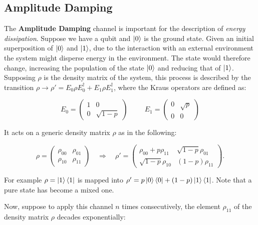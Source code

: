 \subsection{Amplitude Damping} 
\label{Amp_section}

The \textbf{Amplitude Damping} channel is important for the description of \textit{energy dissipation}. Suppose we have a qubit and $\left| 0 \right \rangle$ is the ground state. Given an initial superposition of $\left| 0 \right \rangle$ and $\left| 1 \right \rangle$, due to the interaction with an external environment the system might disperse energy in the environment. The state would therefore change, increasing the population of the state $\left| 0 \right \rangle$ and reducing that of $\left| 1 \right \rangle$. Supposing $\rho$ is the density matrix of the system, this process is described by the transition $\rho \rightarrow \rho' = E_0 \rho E_0^\dagger + E_1 \rho E_1^\dagger$, where the Kraus operators are defined as:

\begin{equation}
E_0 = \begin{pmatrix} 1 & 0\\  0 & \sqrt{1-p} \end{pmatrix} \hspace{1cm} E_1 = \begin{pmatrix} 0 & \sqrt{p} \\  0 & 0 \end{pmatrix}
\label{28_firstchapter}
 \end{equation}

\noindent It acts on a generic density matrix $\rho$ as in the following:
 
 \begin{equation}
\rho = \begin{pmatrix} 
\rho_{00} & \rho_{01} \\
\rho_{10} & \rho_{11} 
\end{pmatrix}
\quad
\Rightarrow
\quad
\rho' = \begin{pmatrix} 
\rho_{00}+ p \rho_{11} & \sqrt{1-p} \rho_{01} \\
 \sqrt{1-p} \rho_{10} & (1-p)\rho_{11} 
\end{pmatrix}.
\label{29_firstchapter}
 \end{equation}
 
\noindent For example $\rho= \left| 1 \right \rangle\left\langle 1 \right |$ is mapped into $ \rho' = p \left| 0 \right \rangle\left\langle 0 \right | + (1-p) \left| 1 \right \rangle\left\langle 1 \right |$. Note that a pure state has become a mixed one.

Now, suppose to apply this channel $n$ times consecutively, the element $\rho_{11}$ of the density matrix $\rho$ decades exponentially:

